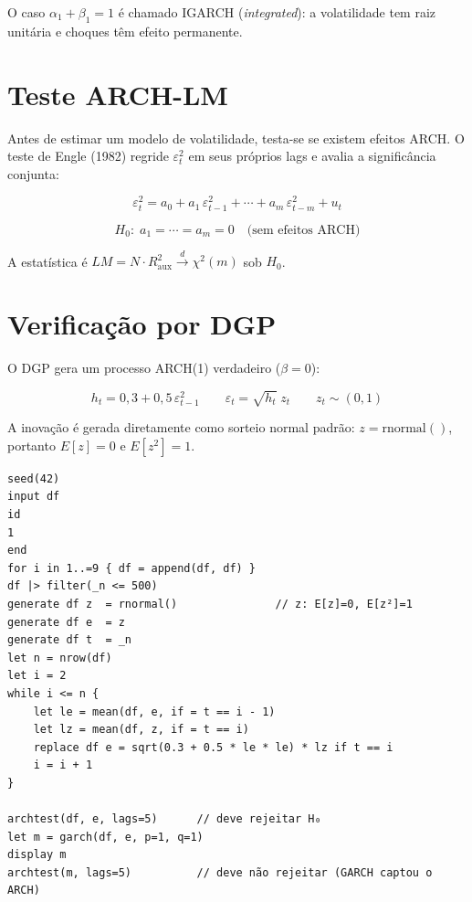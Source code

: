 O caso $\alpha_1 + \beta_1 = 1$ é chamado IGARCH (\emph{integrated}): a
volatilidade tem raiz unitária e choques têm efeito permanente.

\section{Teste ARCH-LM}

Antes de estimar um modelo de volatilidade, testa-se se existem efeitos ARCH.
O teste de Engle (1982) regride $\varepsilon_t^2$ em seus próprios lags e
avalia a significância conjunta:

\[
  \varepsilon_t^2 = a_0 + a_1\,\varepsilon_{t-1}^2 + \cdots + a_m\,\varepsilon_{t-m}^2 + u_t
\]

\[
  H_0{:}\; a_1 = \cdots = a_m = 0
  \quad \text{(sem efeitos ARCH)}
\]

A estatística é $LM = N \cdot R^2_{\text{aux}} \xrightarrow{d} \chi^2(m)$
sob $H_0$.

\section{Verificação por DGP}

O DGP gera um processo ARCH(1) verdadeiro ($\beta=0$):

\[
  h_t = 0{,}3 + 0{,}5\,\varepsilon_{t-1}^2
  \qquad
  \varepsilon_t = \sqrt{h_t}\; z_t
  \qquad
  z_t \sim (0,1)
\]

A inovação é gerada diretamente como sorteio normal padrão:
$z = \text{rnormal}()$, portanto $E[z]=0$ e $E[z^2]=1$.

\begin{lstlisting}[caption={DGP ARCH(1) e estimação GARCH}]
seed(42)
input df
id
1
end
for i in 1..=9 { df = append(df, df) }
df |> filter(_n <= 500)
generate df z  = rnormal()               // z: E[z]=0, E[z²]=1
generate df e  = z
generate df t  = _n
let n = nrow(df)
let i = 2
while i <= n {
    let le = mean(df, e, if = t == i - 1)
    let lz = mean(df, z, if = t == i)
    replace df e = sqrt(0.3 + 0.5 * le * le) * lz if t == i
    i = i + 1
}

archtest(df, e, lags=5)      // deve rejeitar H₀
let m = garch(df, e, p=1, q=1)
display m
archtest(m, lags=5)          // deve não rejeitar (GARCH captou o ARCH)
\end{lstlisting}

